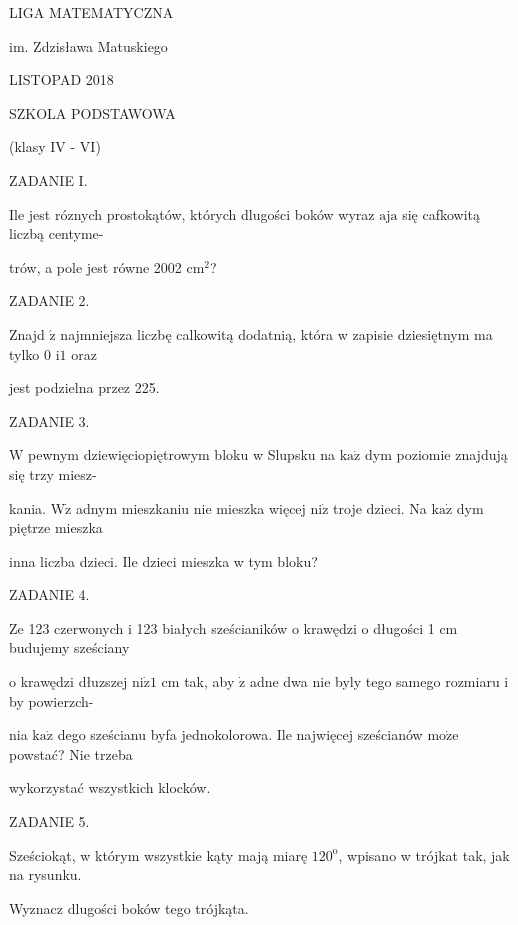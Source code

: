 \documentclass[a4paper,12pt]{article}
\begin{document}
LIGA MATEMATYCZNA

im. Zdzisława Matuskiego

LISTOPAD 2018

SZKOLA PODSTAWOWA

(klasy IV - VI)

ZADANIE I.

Ile jest róznych prostokątów, których dlugości boków wyraz $\mathrm{a}\mathrm{j}\mathrm{a}$ się cafkowitą liczbą centyme-

trów, a pole jest równe 2002 $\mathrm{c}\mathrm{m}^{2}$?

ZADANIE 2.

Znajd $\acute{\mathrm{z}}$ najmniejsza liczbę calkowitą dodatnią, która w zapisie dziesiętnym ma tylko 0 $\mathrm{i}1$ oraz

jest podzielna przez 225.

ZADANIE 3.

$\mathrm{W}$ pewnym dziewięciopiętrowym bloku w Slupsku na $\mathrm{k}\mathrm{a}\dot{\mathrm{z}}$ dym poziomie znajdują się trzy miesz-

kania. $\mathrm{W}\dot{\mathrm{z}}$ adnym mieszkaniu nie mieszka więcej $\mathrm{n}\mathrm{i}\dot{\mathrm{z}}$ troje dzieci. Na $\mathrm{k}\mathrm{a}\dot{\mathrm{z}}$ dym piętrze mieszka

inna liczba dzieci. Ile dzieci mieszka w tym bloku?

ZADANIE 4.

Ze 123 czerwonych i 123 białych sześcianików o krawędzi o długości 1 cm budujemy sześciany

o krawędzi dłuzszej $\mathrm{n}\mathrm{i}\dot{\mathrm{z}}1$ cm tak, aby $\dot{\mathrm{z}}$ adne dwa nie byly tego samego rozmiaru i by powierzch-

nia $\mathrm{k}\mathrm{a}\dot{\mathrm{z}}$ dego sześcianu byfa jednokolorowa. Ile najwięcej sześcianów $\mathrm{m}\mathrm{o}\dot{\mathrm{z}}\mathrm{e}$ powstać? Nie trzeba

wykorzystać wszystkich klocków.

ZADANIE 5.

Sześciokąt, w którym wszystkie kąty mają miarę $120^{\mathrm{o}}$, wpisano w trójkat tak, jak na rysunku.

Wyznacz dlugości boków tego trójkąta.
\end{document}
